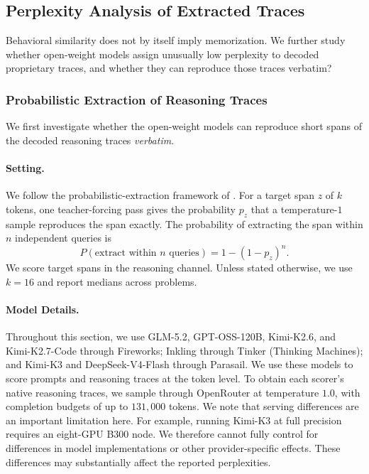 \subsection{Perplexity Analysis of Extracted Traces}\label{app:ppl}

Behavioral similarity does not by itself imply memorization. We further study whether open-weight models assign unusually low perplexity to decoded proprietary traces, and whether they can reproduce those traces verbatim?

\subsubsection{Probabilistic Extraction of Reasoning Traces}\label{app:npextract}

We first investigate whether the open-weight models can reproduce short spans of the decoded reasoning traces \emph{verbatim}.

\paragraph{Setting.} We follow the probabilistic-extraction framework of \citet{hayes2025measuring}. For a target span \(z\) of \(k\) tokens, one teacher-forcing pass gives the probability \(p_z\) that a temperature-\(1\) sample reproduces the span exactly. The probability of extracting the span within \(n\) independent queries is
\[
P(\text{extract within }n\text{ queries})
    = 1-(1-p_z)^n.
\]
We score target spans in the reasoning channel. Unless stated otherwise, we use \(k=16\) and report medians across problems.

\paragraph{Model Details.} Throughout this section, we use GLM-5.2, GPT-OSS-120B, Kimi-K2.6, and Kimi-K2.7-Code through Fireworks; Inkling through Tinker (Thinking Machines); and Kimi-K3 and DeepSeek-V4-Flash through Parasail. We use these models to score prompts and reasoning traces at the token level. To obtain each scorer's native reasoning traces, we sample through OpenRouter at temperature \(1.0\), with completion budgets of up to \(131{,}000\) tokens. We note that serving differences are an important limitation here. For example, running Kimi-K3 at full precision requires an eight-GPU B300 node. We therefore cannot fully control for differences in model implementations or other provider-specific effects. These differences may substantially affect the reported perplexities.


